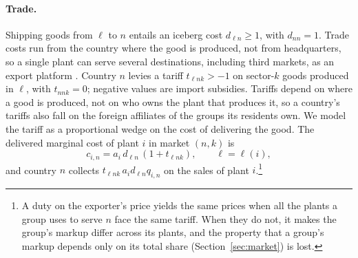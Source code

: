 \documentclass[11pt]{article}
\theoremstyle{definition}
\theoremstyle{remark}
\begin{document}
\paragraph{Trade.} Shipping goods from $\ell$ to $n$ entails an iceberg cost
$d_{\ell n}\ge1$, with $d_{nn}=1$. Trade costs run from the country where the
good is produced, not from headquarters, so a single plant can serve several
destinations, including third markets, as an export platform \citep{Tintelnot2017}.
Country $n$ levies a tariff $t_{\ell nk}>-1$ on sector-$k$ goods produced in $\ell$,
with $t_{nnk}=0$; negative values are import subsidies. Tariffs depend on where a good
is produced, not on who owns the plant that produces it, so a country's tariffs also
fall on the foreign affiliates of the groups its residents own. We model the tariff as
a proportional wedge on the cost of delivering the good. The delivered marginal cost of
plant $i$ in market $(n,k)$ is
\begin{equation}
  c_{i,n}=a_i\,d_{\ell n}\,(1+t_{\ell nk}),\qquad \ell=\ell(i),
  \label{eq:delivered}
\end{equation}
and country $n$ collects $t_{\ell nk}\,a_i d_{\ell n}q_{i,n}$ on the sales of plant
$i$.\footnote{A duty on the exporter's price yields the same prices when all the plants a
group uses to serve $n$ face the same tariff. When they do not, it makes the group's
markup differ across its plants, and the property that a group's markup depends only on
its total share (Section~\ref{sec:market}) is lost.}
\end{document}
